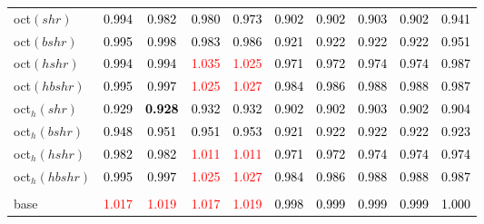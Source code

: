 \begin{tabular}[t]{>{\centering\arraybackslash}m{2.5cm}ccccccccc}
oct$(shr)$ & \textcolor{black}{0.994} & \textcolor{black}{0.982} & \textcolor{black}{0.980} & \textcolor{black}{0.973} & \textcolor{black}{0.902} & \textcolor{black}{0.902} & \textcolor{black}{0.903} & \textcolor{black}{0.902} & \textcolor{black}{0.941}\\
oct$(bshr)$ & \textcolor{black}{0.995} & \textcolor{black}{0.998} & \textcolor{black}{0.983} & \textcolor{black}{0.986} & \textcolor{black}{0.921} & \textcolor{black}{0.922} & \textcolor{black}{0.922} & \textcolor{black}{0.922} & \textcolor{black}{0.951}\\
oct$(hshr)$ & \textcolor{black}{0.994} & \textcolor{black}{0.994} & \textcolor{red}{1.035} & \textcolor{red}{1.025} & \textcolor{black}{0.971} & \textcolor{black}{0.972} & \textcolor{black}{0.974} & \textcolor{black}{0.974} & \textcolor{black}{0.987}\\
oct$(hbshr)$ & \textcolor{black}{0.995} & \textcolor{black}{0.997} & \textcolor{red}{1.025} & \textcolor{red}{1.027} & \textcolor{black}{0.984} & \textcolor{black}{0.986} & \textcolor{black}{0.988} & \textcolor{black}{0.988} & \textcolor{black}{0.987}\\
oct$_h(shr)$ & \textcolor{black}{0.929} & \textcolor{black}{\textbf{0.928}} & \textcolor{black}{0.932} & \textcolor{black}{0.932} & \textcolor{black}{0.902} & \textcolor{black}{0.902} & \textcolor{black}{0.903} & \textcolor{black}{0.902} & \textcolor{black}{0.904}\\
oct$_h(bshr)$ & \textcolor{black}{0.948} & \textcolor{black}{0.951} & \textcolor{black}{0.951} & \textcolor{black}{0.953} & \textcolor{black}{0.921} & \textcolor{black}{0.922} & \textcolor{black}{0.922} & \textcolor{black}{0.922} & \textcolor{black}{0.923}\\
oct$_h(hshr)$ & \textcolor{black}{0.982} & \textcolor{black}{0.982} & \textcolor{red}{1.011} & \textcolor{red}{1.011} & \textcolor{black}{0.971} & \textcolor{black}{0.972} & \textcolor{black}{0.974} & \textcolor{black}{0.974} & \textcolor{black}{0.974}\\
oct$_h(hbshr)$ & \textcolor{black}{0.995} & \textcolor{black}{0.997} & \textcolor{red}{1.025} & \textcolor{red}{1.027} & \textcolor{black}{0.984} & \textcolor{black}{0.986} & \textcolor{black}{0.988} & \textcolor{black}{0.988} & \textcolor{black}{0.987}\\
\addlinespace[0.3em]
\multicolumn{10}{c}{\textbf{$k = 1$}}\\
base & \textcolor{red}{1.017} & \textcolor{red}{1.019} & \textcolor{red}{1.017} & \textcolor{red}{1.019} & \textcolor{black}{0.998} & \textcolor{black}{0.999} & \textcolor{black}{0.999} & \textcolor{black}{0.999} & \textcolor{black}{1.000}\\

\end{tabular}
